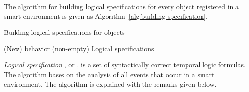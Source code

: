\documentclass[runningheads,a4paper]{llncs}
\begin{document}
The algorithm for building logical specifications for every object registered in a smart environment
is given as Algorithm~\ref{alg:building-specification}.
\begin{algorithm}[htb]
\caption{Building logical specifications for objects }
\label{alg:building-specification}
{\normalsize
\begin{algorithmic}[1]
\algrenewcommand{}
\algrenewcommand{}
\Require (New) behavior  (non-empty)
\Ensure Logical specifications 
\label{alg:divide}

\State  {}

\For{}
\If{}\label{alg:saf-if}
\State{}\label{alg:saf}
\EndIf{}
\EndFor

\label{alg:form-list}
\label{alg:sort-list}

\State{;}
\Repeat\label{alg:repeat-s}
\State{;}
\While{}\label{alg:while-s}
\State{;}
\EndWhile\label{alg:while-e}
\If{}\label{alg:single-sequence}
\State{}\label{alg:liv1}
\Else
\If{}
\State{}\label{alg:liv2}
\EndIf
\EndIf
\Until{}\label{alg:repeat-e}

\EndFor
\end{algorithmic}
}
\end{algorithm}
\emph{Logical specification} ,
or ,
is a set of syntactically correct temporal logic formulas.
The algorithm bases on the analysis of all events that occur in a smart environment.
The algorithm is explained with the remarks given below.
\end{document}
